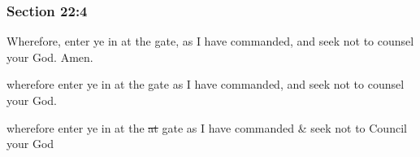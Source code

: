 	\subsubsection{Section 22:4} %
		\label{DC22-4}

		Wherefore, enter ye in at the gate, as I have commanded, and seek not to counsel your God.  Amen.

		\begin{framed}
		\scriptsize
			\begin{compactdesc}
				\item[JSP] wherefore enter ye in at the gate as I have commanded, and seek not to counsel your God.
				\item[RB1] wherefore enter ye in at the \sout{at} gate as I have commanded \& seek not to Council your God
			\end{compactdesc}
		\end{framed}